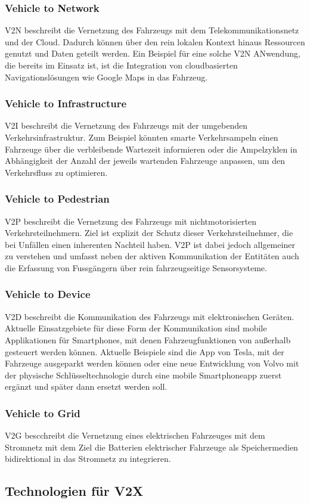     \subsubsection{Vehicle to Network}
    V2N beschreibt die Vernetzung des Fahrzeugs mit dem Telekommunikationsnetz und der Cloud. Dadurch können über den
    rein lokalen Kontext hinaus Ressourcen genutzt und Daten geteilt werden. Ein Beispiel für eine solche V2N ANwendung, die bereits
    im Einsatz ist, ist die Integration von cloudbasierten Navigationslösungen wie Google Maps in das Fahrzeug.
    
    \subsubsection{Vehicle to Infrastructure}
    V2I beschreibt die Vernetzung des Fahrzeugs mit der umgebenden Verkehrsinfrastruktur. Zum Beispiel könnten smarte
    Verkehrsampeln einen Fahrzeuge über die verbleibende Wartezeit informieren oder die Ampelzyklen in Abhängigkeit
    der Anzahl der jeweils wartenden Fahrzeuge anpassen, um den Verkehrsfluss zu optimieren.

    \subsubsection{Vehicle to Pedestrian}
    V2P beschreibt die Vernetzung des Fahrzeugs mit nichtmotorisierten Verkehrsteilnehmern. Ziel ist explizit der
    Schutz dieser Verkehrsteilnehmer, die bei Unfällen einen inherenten Nachteil haben. V2P ist dabei jedoch allgemeiner
    zu verstehen und umfasst neben der aktiven Kommunikation der Entitäten auch die Erfassung von Fussgängern über rein
    fahrzeugseitige Sensorsysteme.

    \subsubsection{Vehicle to Device}
    V2D beschreibt die Kommunikation des Fahrzeugs mit elektronischen Geräten. Aktuelle Einsatzgebiete für diese Form der Kommunikation
    sind mobile Applikationen für Smartphones, mit denen Fahrzeugfunktionen von außerhalb gesteuert werden können. Aktuelle Beispiele
    sind die App von Tesla, mit der Fahrzeuge ausgeparkt werden können oder eine neue Entwicklung von Volvo mit der physische Schlüsseltechnologie
    durch eine mobile Smartphoneapp zuerst ergänzt und später dann ersetzt werden soll. ~\cite{.BP05}
     
    \subsubsection{Vehicle to Grid}
    V2G bescchreibt die Vernetzung eines elektrischen Fahrzeuges mit dem Stromnetz mit dem Ziel die Batterien elektrischer Fahrzeuge als Speichermedien
    bidirektional in das Stromnetz zu integrieren.

    \subsection{Technologien für V2X}
    
